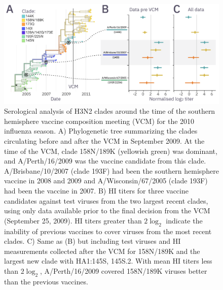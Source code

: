 \documentclass[utf8]{FrontiersinHarvard} %
\begin{document}
\begin{figure}[h!]
  \begin{center}
    \includegraphics[width=\textwidth]{figures/figure-3}
  \end{center}
  \caption{
    Serological analysis of H3N2 clades around the time of the southern hemisphere vaccine composition meeting (VCM) for the 2010 influenza season.
    A) Phylogenetic tree summarizing the clades circulating before and after the VCM in September 2009.
    At the time of the VCM, clade 158N/189K (yellowish green) was dominant, and A/Perth/16/2009 was the vaccine candidate from this clade.
    A/Brisbane/10/2007 (clade 193F) had been the southern hemisphere vaccine in 2008 and 2009 and A/Wisconsin/67/2005 (clade 193F) had been the vaccine in 2007.
    B) HI titers for three vaccine candidates against test viruses from the two largest recent clades, using only data available prior to the final decision from the VCM (September 25, 2009).
    HI titers greater than $2\log_{2}$ indicate the inability of previous vaccines to cover viruses from the most recent clades.
    C) Same as (B) but including test viruses and HI measurements collected after the VCM for 158N/189K and the largest new clade with HA1:145S, 145S.2.
    With mean HI titers less than $2\log_{2}$, A/Perth/16/2009 covered 158N/189K viruses better than the previous vaccines.
  }
  \label{fig:3}
\end{figure}
\end{document}
